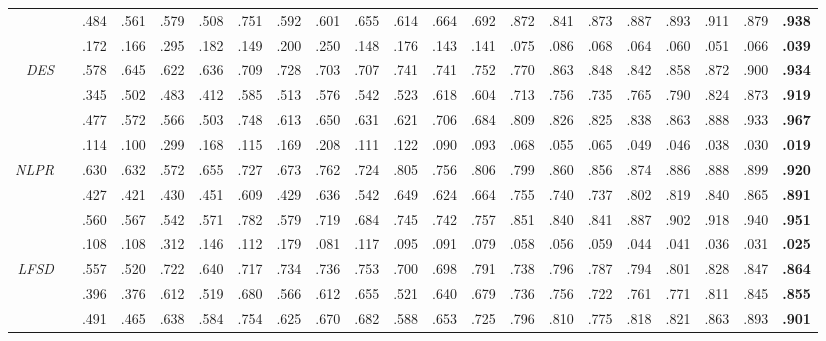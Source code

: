 \documentclass[10pt,twocolumn,letterpaper]{article}
\begin{document}
\begin{table*}[t!]
\begin{tabular}{rr|cccccccccc|cccccccc|c}
    &        & .484 & .561 & .579 &.508  & .751 & .592 & .601 & .655 & .614 & .664 & .692 & .872 & .841 & .873 & .887 & .893 & .911 & .879 & \textbf{.938}\\
    &  & .172 & .166 & .295 & .182 & .149 & .200 & .250 & .148 & .176 & .143 & .141 & .075 & .086 & .068 & .064 & .060 & .051 & .066 & \textbf{.039}\\ \hline
\multirow{4}{*}{\textit{DES} \cite{cheng2014depth}}
    &     & .578 & .645 & .622 & .636 & .709 & .728 & .703 & .707 & .741 & .741 & .752 & .770 & .863 & .848 & .842 & .858 & .872 & .900 & \textbf{.934}\\
    &      & .345 & .502 & .483 & .412 & .585 & .513 & .576 & .542 & .523 & .618 & .604 & .713 & .756 & .735 & .765 & .790 & .824 & .873 & \textbf{.919}\\
    &        & .477 & .572 & .566 & .503 & .748 & .613 & .650 & .631 & .621 & .706 & .684 & .809 & .826 & .825 & .838 & .863 & .888 & .933 & \textbf{.967}\\
    &  & .114 & .100 & .299 & .168 & .115 & .169 & .208 & .111 & .122 & .090 & .093 & .068 & .055 & .065 & .049 & .046 & .038 & .030 & \textbf{.019}\\ \hline
\multirow{4}{*}{\textit{NLPR} \cite{peng2014rgbd}}
    &     & .630 & .632 & .572 & .655 & .727 & .673 & .762 & .724 & .805 & .756 & .806 & .799 & .860 & .856 & .874 & .886 & .888 & .899 & \textbf{.920}\\
    &      & .427 & .421 & .430 & .451 & .609 & .429 & .636 & .542 & .649 & .624 & .664 & .755 & .740 & .737 & .802 & .819 & .840 & .865 & \textbf{.891}\\
    &        & .560 & .567 & .542 & .571 & .782 & .579 & .719 & .684 & .745 & .742 & .757 & .851 & .840 & .841 & .887 & .902 & .918 & .940 & \textbf{.951}\\
    &  & .108 & .108 & .312 & .146 & .112 & .179 & .081 & .117 & .095 & .091 & .079 & .058 & .056 & .059 & .044 & .041 & .036 & .031 & \textbf{.025}\\ \hline
\multirow{4}{*}{\textit{LFSD} \cite{li2014saliency}}
    &     & .557 & .520 & .722 & .640 & .717 & .734 & .736 & .753 & .700 & .698 & .791 & .738 & .796 & .787 & .794 & .801 & .828 & .847& \textbf{.864} \\
    &      & .396 & .376 & .612 & .519 & .680 & .566 & .612 & .655 & .521 & .640 & .679 & .736 & .756 & .722 & .761 & .771 & .811 & .845 & \textbf{.855}\\
    &        & .491 & .465 & .638 & .584 & .754 & .625 & .670 & .682 & .588 & .653 & .725 & .796 & .810 & .775 & .818 & .821 & .863 & .893 & \textbf{.901}\\

\end{tabular}
\end{table*}
\end{document}
